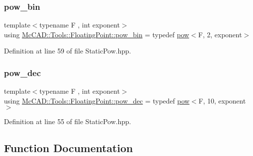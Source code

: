 \subsubsection{\texorpdfstring{pow\+\_\+bin}{pow\_bin}}
{\footnotesize\ttfamily template$<$typename F , int exponent$>$ \\
using \hyperlink{namespaceMcCAD_1_1Tools_1_1FloatingPoint_ad668f5149777d636ded664cb5e7e2940}{Mc\+C\+A\+D\+::\+Tools\+::\+Floating\+Point\+::pow\+\_\+bin} = typedef \hyperlink{structMcCAD_1_1Tools_1_1FloatingPoint_1_1pow}{pow}$<$F, 2, exponent$>$}



Definition at line 59 of file Static\+Pow.\+hpp.

\mbox{\label{namespaceMcCAD_1_1Tools_1_1FloatingPoint_a0b858b88c4f82794ed9b131334b83ade}} 
\subsubsection{\texorpdfstring{pow\+\_\+dec}{pow\_dec}}
{\footnotesize\ttfamily template$<$typename F , int exponent$>$ \\
using \hyperlink{namespaceMcCAD_1_1Tools_1_1FloatingPoint_a0b858b88c4f82794ed9b131334b83ade}{Mc\+C\+A\+D\+::\+Tools\+::\+Floating\+Point\+::pow\+\_\+dec} = typedef \hyperlink{structMcCAD_1_1Tools_1_1FloatingPoint_1_1pow}{pow}$<$F, 10, exponent$>$}



Definition at line 55 of file Static\+Pow.\+hpp.



\subsection{Function Documentation}
\mbox{\label{namespaceMcCAD_1_1Tools_1_1FloatingPoint_a025cc7d8e1f64ef7e30b80e7cbe48f5c}} 
